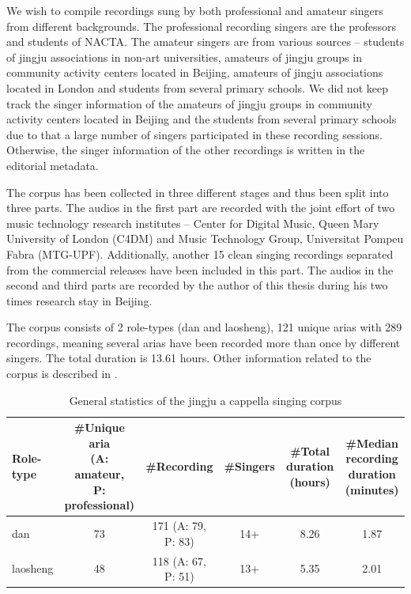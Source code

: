 We wish to compile recordings sung by both professional and amateur singers from different backgrounds. The professional recording singers are the professors and students of NACTA. The amateur singers are from various sources -- students of jingju associations in non-art universities, amateurs of jingju groups in community activity centers located in Beijing, amateurs of jingju associations located in London and students from several primary schools. We did not keep track the singer information of the amateurs of jingju groups in community activity centers located in Beijing and the students from several primary schools due to that a large number of singers participated in these recording sessions. Otherwise, the singer information of the other recordings is written in the editorial metadata. 

The corpus has been collected in three different stages and thus been split into three parts. The audios in the first part are recorded with the joint effort of two music technology research institutes -- Center for Digital Music, Queen Mary University of London (C4DM) \cite{Black2014} and Music Technology Group, Universitat Pompeu Fabra (MTG-UPF). Additionally, another 15 clean singing recordings separated from the commercial releases have been included in this part. The audios in the second and third parts are recorded by the author of this thesis during his two times research stay in Beijing.

The corpus consists of 2 role-types (dan and laosheng), 121 unique arias with 289 recordings, meaning several arias have been recorded more than once by different singers. The total duration is 13.61 hours. Other information related to the corpus is described in .

\begin{landscape}
\mbox{}\vfill
\begin{table}[ht]
    \centering
    \begin{tabular}{l|ccccc}
        \toprule
        Role-type & \makecell{\#Unique aria\\(A: amateur,\\P: professional)} & \#Recording & \#Singers & \makecell{\#Total duration\\(hours)} & \makecell{\#Median recording\\duration (minutes)} \\
        \midrule
        dan           & 73 & 171 (A: 79, P: 83) & 14+ & 8.26 & 1.87 \\
        laosheng      & 48 & 118 (A: 67, P: 51) & 13+ & 5.35 & 2.01 \\
        \bottomrule
    \end{tabular}
    \caption{General statistics of the jingju a cappella singing corpus}
    \label{table:ch4:general_statistics_jingju_a_cappella_corpus}
\end{table}
\vfill
\end{landscape}

